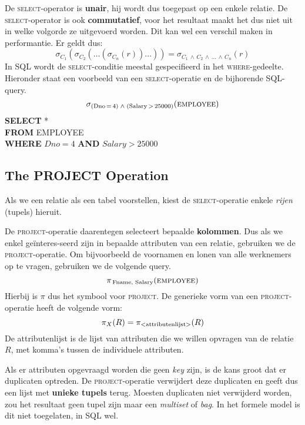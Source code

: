 \noindent De \textsc{select}-operator is \textbf{unair}, hij wordt dus toegepast op een enkele relatie. De \textsc{select}-operator is ook \textbf{commutatief}, voor het resultaat maakt het dus niet uit in welke volgorde ze uitgevoerd worden. Dit kan wel een verschil maken in performantie. Er geldt dus:
\vspace{-2mm}
\[ \sigma_{C_1} \left( \sigma_{C_2} \left( \dots \left( \sigma_{C_n} \left( r \right) \right) \dots \right) \right) = \sigma_{C_1 \,\wedge\, C_2 \,\wedge\, \dots \,\wedge\, C_n}(r) \]
In SQL wordt de \textsc{select}-conditie meestal gespecifieerd in het \textsc{where}-gedeelte. Hieronder staat een voorbeeld van een \textsc{select}-operatie en de bijhorende SQL-query.
\vspace{-2mm}
\[ \sigma_{(\text{Dno}\,=\,4) \; \wedge \; (\text{Salary}\,>\,25000)}(\textsc{employee}) \]
\indent \textbf{SELECT} *\\
\indent \textbf{FROM} EMPLOYEE\\
\indent	\textbf{WHERE} $\textit{Dno}=4$ \textbf{AND} $\textit{Salary}>25000$


\subsection{The PROJECT Operation}
Als we een relatie als een tabel voorstellen, kiest de \textsc{select}-operatie enkele \textit{rijen} (tupels) hieruit.

De \textsc{project}-operatie daarentegen selecteert bepaalde \textbf{kolommen}. Dus als we enkel ge\"interes-seerd zijn in bepaalde attributen van een relatie, gebruiken we de \textsc{project}-operatie. Om bijvoorbeeld de voornamen en lonen van alle werknemers op te vragen, gebruiken we de volgende query.
\vspace{-2mm}
\[ \pi_{\,\text{Fname, Salary}}(\textsc{employee}) \]
Hierbij is $\pi$ dus het symbool voor \textsc{project}. De generieke vorm van een \textsc{project}-operatie heeft de volgende vorm:
\vspace{-2mm}
\[ \pi_X(R) = \pi_\text{{\textless}attributenlijst{\textgreater}}(R) \]
De attributenlijst is de lijst van attributen die we willen opvragen van de relatie $R$, met komma's tussen de individuele attributen.

Als er attributen opgevraagd worden die geen \textit{key} zijn, is de kans groot dat er duplicaten optreden. De \textsc{project}-operatie verwijdert deze duplicaten en geeft dus een lijst met \textbf{unieke tupels} terug. Moesten duplicaten niet verwijderd worden, zou het resultaat geen tupel zijn maar een \textit{multiset} of \textit{bag}. In het formele model is dit niet toegelaten, in SQL wel.

